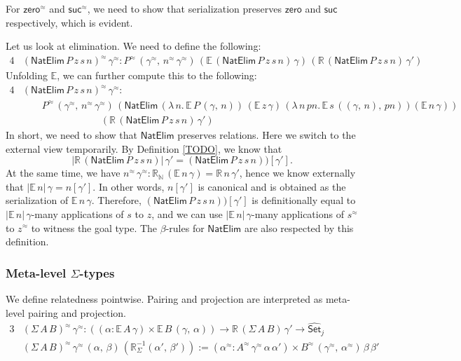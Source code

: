 \documentclass[acmsmall]{acmart}
\newcommand{\mit}[1]{\mathit{#1}}
\newcommand{\msf}[1]{\mathsf{#1}}
\newcommand{\mbb}[1]{\mathbb{#1}}
\newcommand{\wh}[1]{\widehat{#1}}
\newcommand{\zero}{\msf{zero}}
\newcommand{\suc}{\msf{suc}}
\newcommand{\Set}{\mathsf{Set}}
\newcommand{\ev}{\mbb{E}}
\newcommand{\re}{\mbb{R}}
\theoremstyle{remark}
\newcommand{\whset}{\wh{\Set}}
\newcommand{\rel}{^{\approx}}
\begin{document}
For $\zero\rel$ and $\suc\rel$, we need to show that serialization preserves
$\zero$ and $\suc$ respectively, which is evident.

Let us look at elimination. We need to define the following:
\begin{alignat*}{4}
  &(\msf{NatElim}\,P\,z\,s\,n)\rel\,\gamma\rel :
  P\rel\,(\gamma\rel,\,n\rel\,\gamma\rel)\,(\ev\,(\msf{NatElim}\,P\,z\,s\,n)\,\gamma)\,
                                           (\re\,(\msf{NatElim}\,P\,z\,s\,n)\,\gamma')
\end{alignat*}
Unfolding $\ev$, we can further compute this to the following:
\begin{alignat*}{4}
  &(\msf{NatElim}\,P\,z\,s\,n)\rel\,\gamma\rel : \\
  &\hspace{2em}P\rel\,(\gamma\rel,\,n\rel\,\gamma\rel)\,
  (\msf{NatElim}\,(\lambda\,n.\,\ev\,P\,(\gamma,\,n))\,
                  (\ev\,z\,\gamma)\,
                  (\lambda\,n\,\mit{pn}.\,\ev\,s\,((\gamma,\,n),\,\mit{pn}))
                  (\ev\,n\,\gamma))\\
  &\hspace{8em}(\re\,(\msf{NatElim}\,P\,z\,s\,n)\,\gamma')
\end{alignat*}
In short, we need to show that $\msf{NatElim}$ preserves relations. Here we
switch to the external view temporarily. By Definition \ref{TODO}, we know that
\[
   |\re\,(\msf{NatElim}\,P\,z\,s\,n)|\,\gamma' = (\msf{NatElim}\,P\,z\,s\,n))[\gamma'].
\]
At the same time, we have $n\rel\,\gamma\rel : \re_{\mbb{N}}\,(\ev\,n\,\gamma) =
\re\,n\,\gamma'$, hence we know externally that $|\ev\,n|\,\gamma = n[\gamma']$.
In other words, $n[\gamma']$ is canonical and is obtained as the serialization
of $\ev\,n\,\gamma$. Therefore, $(\msf{NatElim}\,P\,z\,s\,n))[\gamma']$ is
definitionally equal to $|\ev\,n|\,\gamma$-many applications of $s$ to
$z$, and we can use $|\ev\,n|\,\gamma$-many applications of $s\rel$ to $z\rel$
to witness the goal type. The $\beta$-rules for $\msf{NatElim}$ are also respected
by this definition.

\subsubsection{Meta-level $\Sigma$-types} We define relatedness pointwise. Pairing and projection
are interpreted as meta-level pairing and projection.
\begin{alignat*}{3}
  &(\Sigma\,A\,B)\rel\,\gamma\rel : ((\alpha : \ev\,A\,\gamma) \times \ev\,B\,(\gamma,\,\alpha))
             \to \re\,(\Sigma\,A\,B)\,\gamma' \to \whset_j\\
  &(\Sigma\,A\,B)\rel\,\gamma\rel\,(\alpha,\,\beta)\,(\re_{\Sigma}^{-1}(\alpha',\,\beta')) :=
             (\alpha\rel : A\rel\,\gamma\rel\,\alpha\,\alpha') \times B\rel\,(\gamma\rel,\,\alpha\rel)\,\beta\,\beta'
\end{alignat*}
\end{document}
